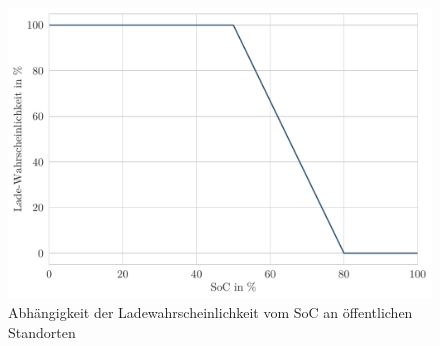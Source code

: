 \begin{figure}[H]
    \centering
    \includegraphics[width=\textwidth]{Bilder/soc_charging_prob}
    \caption{Abhängigkeit der Ladewahrscheinlichkeit vom SoC an öffentlichen Standorten}\label{fig:soc_charging_prob}
\end{figure}